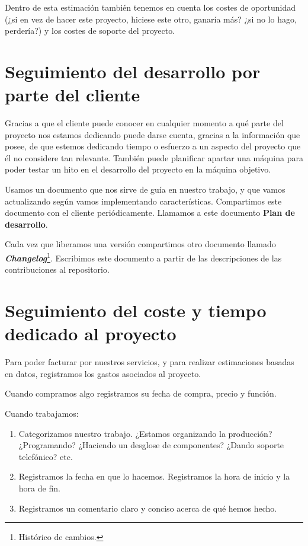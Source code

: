 Dentro de esta estimación también tenemos en cuenta los costes de
oportunidad (¿si en vez de hacer este proyecto, hiciese este otro,
ganaría más? ¿si no lo hago, perdería?) y los costes de soporte del proyecto.

\section{Seguimiento del desarrollo por parte del cliente}

Gracias a que el cliente puede conocer en cualquier momento a qué 
parte del proyecto nos estamos dedicando puede darse cuenta,
gracias a la información que posee, de que estemos dedicando tiempo
o esfuerzo a un aspecto del proyecto que él no considere tan
relevante. También puede planificar apartar una máquina para poder
testar un hito en el desarrollo del proyecto en la máquina objetivo.

Usamos un documento que nos sirve de guía en nuestro trabajo, y que
vamos actualizando según vamos implementando características.
Compartimos este documento con el cliente periódicamente.
Llamamos a este documento \textbf{Plan de desarrollo}.

Cada vez que liberamos una versión compartimos otro documento llamado
\textit{\textbf{Changelog}}\footnote{Histórico de cambios.}. Escribimos
este documento a partir de las descripciones de las contribuciones al
repositorio.

\section{Seguimiento del coste y tiempo dedicado al proyecto}

Para poder facturar por nuestros servicios, y para realizar estimaciones
basadas en datos, registramos los gastos asociados al proyecto.

Cuando compramos algo registramos su fecha de compra, precio y función.

Cuando trabajamos:
\begin{enumerate}
    \item Categorizamos nuestro trabajo. ¿Estamos organizando la producción?
          ¿Programando? ¿Haciendo un desglose de componentes? ¿Dando soporte
          telefónico? etc.
    \item Registramos la fecha en que lo hacemos. Registramos la hora de inicio
          y la hora de fin.
    \item Registramos un comentario claro y conciso acerca de qué hemos hecho.
\end{enumerate}

